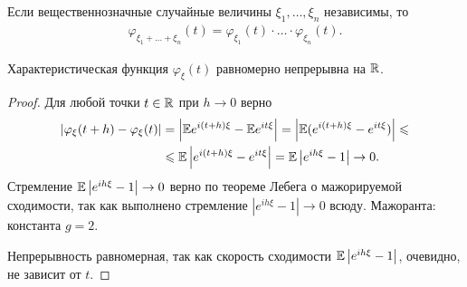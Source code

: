 \documentclass[../main.tex]{subfiles}
\begin{document}
\begin{crly}
 Если вещественнозначные случайные величины $ \xi_1, \ldots, \xi_n $ независимы, то
 \begin{align*}
  \varphi_{\xi_1 + \ldots + \xi_n}(t) = \varphi_{\xi_1}(t) \cdot \ldots \cdot \varphi_{\xi_n}(t).
 \end{align*}
\end{crly}

\begin{prop}
 Характеристическая функция $ \varphi_\xi(t) $ равномерно непрерывна на $ \mathbb{R} $.
\end{prop}
\begin{proof}
 Для любой точки $ t \in \mathbb{R} $ при $ h \to 0 $ верно
 \begin{align*}
  \left| \varphi_\xi(t + h) - \varphi_\xi(t) \right| &= \left|\mathbb E e^{i(t+h)\xi} - \mathbb E e^{it\xi} \right| = \left| \mathbb E (e^{i(t+h)\xi} - e^{it\xi}) \right| \leqslant \\
  &\leqslant \mathbb E \left| e^{i(t+h)\xi} - e^{it\xi} \right| = \mathbb E \left| e^{ih\xi} - 1 \right| \to 0.
 \end{align*} Стремление $ \mathbb E \left| e^{ih\xi}-1 \right| \to 0 $ верно по теореме Лебега о мажорируемой сходимости, так как выполнено стремление $ \left|e^{ih\xi} - 1 \right| \to 0 $ всюду. Мажоранта: константа $ g = 2 $.

 Непрерывность равномерная, так как скорость сходимости $ \mathbb E \left| e^{ih\xi}-1 \right| $, очевидно, не зависит от $ t $.
\end{proof}
\end{document}
